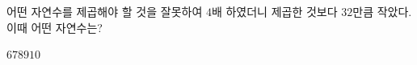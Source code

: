 어떤 자연수를 제곱해야 할 것을 잘못하여 $4$배 하였더니 제곱한 것보다 $32$만큼 작았다. 이때 어떤 자연수는?
\begin{choices32}{$6$}{$7$}{$8$}{$9$}{$10$}\end{choices32}
